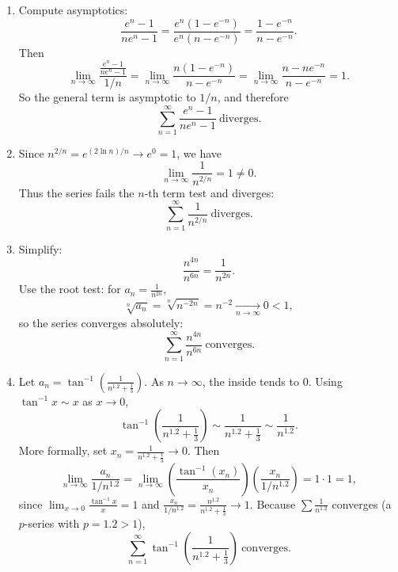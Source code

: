 \documentclass[12pt]{article}
\begin{document}
\begin{enumerate}[label=(\alph*)]
\item Compute asymptotics:
\[
\frac{e^n-1}{n e^n-1}
=\frac{e^n\left(1-e^{-n}\right)}{e^n\left(n-e^{-n}\right)}
=\frac{1-e^{-n}}{n-e^{-n}}.
\]
Then
\[
\lim_{n\to\infty}\frac{\frac{e^n-1}{n e^n-1}}{1/n}
=\lim_{n\to\infty}\frac{n(1-e^{-n})}{n-e^{-n}}
=\lim_{n\to\infty}\frac{n-n e^{-n}}{n-e^{-n}}=1.
\]
So the general term is asymptotic to \(1/n\), and therefore
\[
\boxed{\sum_{n=1}^{\infty}\frac{e^n-1}{n e^n-1}\ \text{diverges}.}
\]

\item Since \(n^{2/n}=e^{(2\ln n)/n}\to e^0=1\), we have
\[
\lim_{n\to\infty}\frac{1}{n^{2/n}}=1\neq 0.
\]
Thus the series fails the \(n\)-th term test and diverges:
\[
\boxed{\sum_{n=1}^{\infty}\frac{1}{n^{2/n}}\ \text{diverges}.}
\]

\item Simplify:
\[
\frac{n^{4n}}{n^{6n}}=\frac{1}{n^{2n}}.
\]
Use the root test: for \(a_n=\frac{1}{n^{2n}}\),
\[
\sqrt[n]{a_n}=\sqrt[n]{n^{-2n}}=n^{-2}\xrightarrow[n\to\infty]{}0<1,
\]
so the series converges absolutely:
\[
\boxed{\sum_{n=1}^{\infty}\frac{n^{4n}}{n^{6n}}\ \text{converges}.}
\]

\item Let \(a_n=\tan^{-1}\!\left(\frac{1}{n^{1.2}+\tfrac13}\right)\).
As \(n\to\infty\), the inside tends to \(0\). Using \(\tan^{-1}x\sim x\) as \(x\to 0\),
\[
\tan^{-1}\!\left(\frac{1}{n^{1.2}+\tfrac13}\right)\sim \frac{1}{n^{1.2}+\tfrac13}\sim \frac{1}{n^{1.2}}.
\]
More formally, set \(x_n=\frac{1}{n^{1.2}+\tfrac13}\to 0\). Then
\[
\lim_{n\to\infty}\frac{a_n}{1/n^{1.2}}
=
\lim_{n\to\infty}
\left(\frac{\tan^{-1}(x_n)}{x_n}\right)
\left(\frac{x_n}{1/n^{1.2}}\right)
=
1\cdot 1=1,
\]
since \(\lim_{x\to 0}\frac{\tan^{-1}x}{x}=1\) and
\(\frac{x_n}{1/n^{1.2}}=\frac{n^{1.2}}{n^{1.2}+\tfrac13}\to 1\).
Because \(\sum \frac{1}{n^{1.2}}\) converges (a \(p\)-series with \(p=1.2>1\)),
\[
\boxed{\sum_{n=1}^{\infty}\tan^{-1}\!\left(\frac{1}{n^{1.2}+\tfrac13}\right)\ \text{converges}.}
\]
\end{enumerate}
\end{document}
